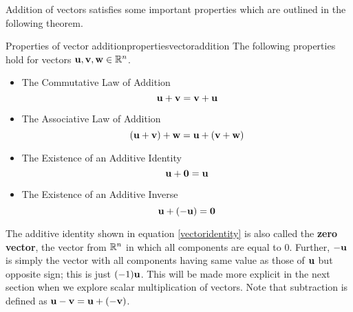 Addition of vectors satisfies some important properties which are outlined in the following theorem.  

\begin{theorem}{Properties of vector addition}{propertiesvectoraddition}
The following properties hold for vectors ${\bf u},{\bf v}, {\bf w} \in \mathbb{R}^{n}$.
\begin{itemize}
\item The Commutative Law of Addition
\begin{equation*}
{\bf u}+{\bf v}={\bf v}+{\bf u}
\end{equation*}
\item The Associative Law of Addition
\begin{equation*}
\left({\bf u}+{\bf v}\right) +{\bf w}={\bf u}+\left({\bf v}+{\bf w}\right)
\end{equation*}
\item The Existence of an Additive Identity
\begin{equation}
{\bf u}+{\bf 0}={\bf u}
\label{vectoridentity} 
\end{equation}
\item The Existence of an Additive Inverse
\begin{equation*}
{\bf u}+\left(-{\bf u}\right) ={\bf 0}  
\end{equation*}
\end{itemize}
\end{theorem}

The additive identity shown in equation
\ref{vectoridentity} is also called the \textbf{zero vector}, 
the vector from $\mathbb{R}^{n}$ in which all components are equal to $0$.
Further, $-{\bf u}$ is simply the vector with all components having
same value as those of ${\bf u}$ but opposite sign; this is just
$(-1){\bf u}$. This will be made more explicit in the next
section when we explore scalar multiplication of vectors. Note that subtraction is defined as ${\bf u}-{\bf v} = {\bf u}+\left(
-{\bf v} \right)$.
